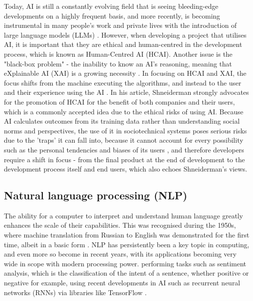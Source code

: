 \documentclass[12pt]{report}
\begin{document}
    Today, AI is still a constantly evolving field that is seeing bleeding-edge developments on a 
    highly frequent basis, and more recently, is becoming instrumental in many people's work and private lives 
    with the introduction of large language models (LLMs) \autocite{AIDigitalAssistants}.
    However, when developing a project that utilises AI, it is important that 
    they are ethical and human-centred in the development process, which is known as Human-Centred AI (HCAI). 
    Another issue is the "black-box problem" - the inability to know an AI's reasoning, meaning that 
    eXplainable AI (XAI) is a growing necessity \autocite{miro-nicolau_comprehensive_2025}. In focusing on 
    HCAI and XAI, the focus shifts from the machine executing the algorithms, and instead to the user and their experience 
    using the AI \autocite{AIEthics}. In his article, Shneiderman strongly advocates for the 
    promotion of HCAI for the benefit of both companies and their users, which is a commonly accepted 
    idea due to the ethical risks of using AI. Because AI calculates outcomes from its training data rather 
    than understanding social norms and perspectives, the use of it in sociotechnical systems poses serious risks 
    due to the 'traps' it can fall into, because it cannot account for every possibility such as the personal tendencies 
    and biases of its users \autocite{selbst_fairness_2019}, and therefore developers require a shift in focus - from the final product
    at the end of development to the development process itself and end users, which also echoes Shneiderman's views. 

    \subsection{Natural language processing (NLP)}

    The ability for a computer to interpret and understand human language greatly enhances the scale of their capabilities. This was 
    recognised during the 1950s, where machine translation from Russian to English was demonstrated for the first time, albeit in a basic form \autocite{zampolli_natural_1994}.
    NLP has persistently been a key topic in computing, and even more so become in recent years, with its applications becoming very wide in scope with modern processing power.
    performing tasks such as sentiment analysis, which is the classification of the intent of a sentence, whether positive or negative for
    example, using recent developments in AI such as recurrent neural networks (RNNs) via libraries like TensorFlow \autocite{abadi_tensorflow_2016}.
\end{document}
